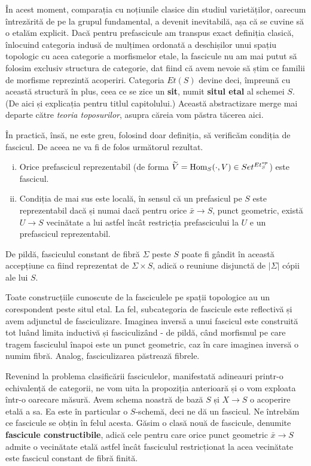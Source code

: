 \documentclass[13pt,openany,oneside]{book}
\begin{document}
În acest moment, comparația cu noțiunile clasice din studiul varietăților, oarecum întrezărită de pe la grupul fundamental, a devenit inevitabilă, așa că se cuvine să o etalăm explicit. Dacă pentru prefascicule am transpus exact definiția clasică, înlocuind categoria indusă de mulțimea ordonată a deschișilor unui spațiu topologic cu acea categorie a morfismelor etale, la fascicule nu am mai putut să folosim exclusiv structura de categorie, dat fiind că avem nevoie să știm ce familii de morfisme reprezintă acoperiri. Categoria $Et(S)$ devine deci, împreună cu această structură în plus, ceea ce se zice un {\bf sit}, numit {\bf situl etal} al schemei $S$. (De aici și explicația pentru titlul capitolului.) Această abstractizare merge mai departe către {\it teoria toposurilor}, asupra căreia vom păstra tăcerea aici.

În practică, însă, ne este greu, folosind doar definiția, să verificăm condiția de fascicul. De aceea ne va fi de folos următorul rezultat.

\begin{prop}
\begin{enumerate}[i)]
\item Orice prefascicul reprezentabil (de forma $\widetilde{V} = \text{{\normalfont Hom}}_S(\cdot,V) \in Set^{Et_S^{op}}$) este fascicul.
\item Condiția de mai sus este locală, în sensul că un prefasicul pe $S$ este reprezentabil dacă și numai dacă pentru orice $\bar{x} \rightarrow S$, punct geometric, există $U \rightarrow S$ vecinătate a lui astfel încât restricția prefascicului la $U$ e un prefascicul reprezentabil.
\end{enumerate}
\end{prop}

De pildă, fasciculul constant de fibră $\Sigma$ peste $S$ poate fi gândit în această accepțiune ca fiind reprezentat de $\Sigma \times S$, adică o reuniune disjunctă de $|\Sigma|$ cópii ale lui $S$.

Toate construcțiile cunoscute de la fasciculele pe spații topologice au un corespondent peste situl etal. La fel, subcategoria de fascicule este reflectivă și avem adjunctul de fasciculizare. Imaginea inversă a unui fascicul este construită tot luând limita inductivă și fasciculizând - de pildă, când morfismul pe care tragem fasciculul înapoi este un punct geometric, caz în care imaginea inversă o numim fibră. Analog, fasciculizarea păstrează fibrele.

Revenind la problema clasificării fasciculelor, manifestată adineauri printr-o echivalență de categorii, ne vom uita la propoziția anterioară și o vom exploata într-o oarecare măsură. Avem schema noastră de bază $S$ și $X \rightarrow S$ o acoperire etală a sa. Ea este în particular o $S$-schemă, deci ne dă un fascicul. Ne întrebăm ce fascicule se obțin în felul acesta. Găsim o clasă nouă de fascicule, denumite {\bf fascicule constructibile}, adică cele pentru care orice punct geometric $\bar{x} \rightarrow S$ admite o vecinătate etală astfel încât fasciculul restricționat la acea vecinătate este fascicul constant de fibră finită.
\end{document}
